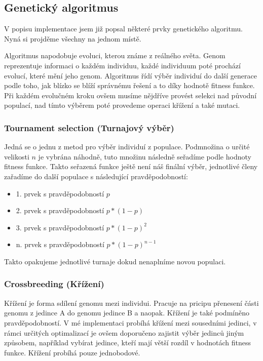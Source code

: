 \documentclass{article}
\begin{document}
    \subsection{Genetický algoritmus}

    V popisu implementace jsem již popsal některé prvky genetického algoritmu. Nyná si projděme všechny na jednom místě.

    Algoritmus napodobuje evoluci, kterou známe z reálného světa. Genom reprezentuje informaci o každém individuu, každé individuum poté prochází
    evolucí, které mění jeho genom. Algoritmus řídí výběr individuí do další generace podle toho, jak blízko se blíží správnému řešení a to díky
    hodnotě fitness funkce. Při každém evolučném kroku ovšem musíme nějdříve provést selekci nad původní populací, nad tímto výběrem poté provedeme
    operaci křížení a také mutaci.

    \subsubsection{Tournament selection (Turnajový výběr)}

    Jedná se o jednu z metod pro výběr individuí z populace. Podmnožina o určité velikosti $n$ je vybrána náhodně, tuto množinu následně seřadíme podle hodnoty
    fitness funkce. Takto seřazená funkce ještě není náš finální výběr, jednotlivé členy zařadíme do další populace s následující pravděpodobností:
    \begin{itemize}
        \item {1. prvek s pravděpodobností $p$}
        \item {2. prvek s pravděpodobností $p*(1-p)$}
        \item {3. prvek s pravděpodobností $p*(1-p)^2$}
        \item {n. prvek s pravděpodobností $p*(1-p)^{n-1}$}
    \end{itemize}

    Takto opakujeme jednotlivé turnaje dokud nenaplníme novou populaci.

    \subsubsection{Crossbreeding (Křížení)}

    Křížení je forma sdílení genomu mezi individui. Pracuje na pricipu přenesení části genomu z jedince A do genomu jedince B a naopak. Křížení je také podmíněno pravděpodobností.
    V mé implementaci probíhá křížení mezi sousedními jedinci, v rámci určitých optimalizací je ovšem doporučeno zajistit výběr jedinců jiným způsobem, například vybírat jedince, kteří
    mají větší rozdíl v hodnotách fitness funkce. Křížení probíhá pouze jednobodové.
\end{document}
